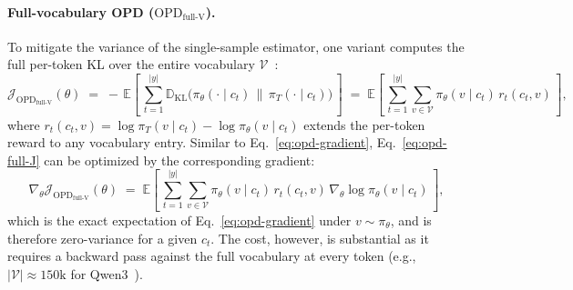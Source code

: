 \documentclass{article}
\begin{document}
\paragraph{Full-vocabulary OPD ($\text{OPD}_\text{full-V}$).}
To mitigate the variance of the single-sample estimator, one variant
computes the full per-token KL over the entire vocabulary $\mathcal{V}$~\citep{agarwal2024onpolicy}:
\begin{equation}
\label{eq:opd-full-J}
\mathcal{J}_{\text{OPD}_\text{full-V}}(\theta)
\;=\;
-\,\mathbb{E}\!\left[\, \sum_{t=1}^{|y|} \mathbb{D}_\mathrm{KL}\!\bigl(\pi_\theta(\cdot\mid c_t) \,\big\|\, \pi_T(\cdot\mid c_t)\bigr) \,\right]
\;=\;
\mathbb{E}\!\left[\, \sum_{t=1}^{|y|} \sum_{v \in \mathcal{V}} \pi_\theta(v\mid c_t)\,r_t(c_t,v) \,\right],
\end{equation}
where $r_t(c_t,v) = \log\pi_T(v\mid c_t) - \log\pi_\theta(v\mid c_t)$ extends
the per-token reward to any vocabulary entry. Similar to Eq.~\eqref{eq:opd-gradient}, Eq.~\eqref{eq:opd-full-J} can be optimized by the corresponding gradient:
\begin{equation}
\label{eq:opd-full-grad}
\nabla_\theta\mathcal{J}_{\text{OPD}_\text{full-V}}(\theta)
\;=\;
\mathbb{E}\!\left[\, \sum_{t=1}^{|y|} \sum_{v \in \mathcal{V}} \pi_\theta(v\mid c_t)\,r_t(c_t,v)\,\nabla_\theta\log \pi_\theta(v\mid c_t) \,\right],
\end{equation}
which is the exact expectation of Eq.~\eqref{eq:opd-gradient} under $v \sim \pi_\theta$, and is therefore zero-variance for a given $c_t$. The cost, however, is substantial as it requires a backward pass against the full vocabulary at every token (e.g., $|\mathcal{V}| \approx 150\mathrm{k}$ for Qwen3~\citep{yang2025qwen3}).
\end{document}
